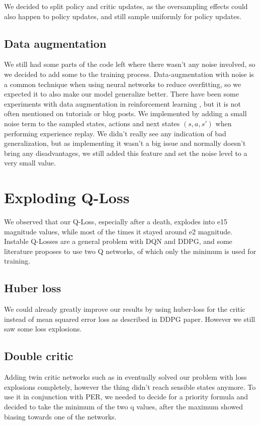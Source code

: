 \documentclass[hyperref,german,beleg]{cgvpub}
\begin{document}
We decided to split policy and critic updates, as the oversampling effects could also happen to policy updates, and still sample uniformly for policy updates. 

\subsection{Data augmentation}

We still had some parts of the code left where there wasn't any noise involved, so we decided to add some to the training process. Data-augmentation with noise is a common technique when using neural networks \cite[p.347]{bishopNeuralNetworksPattern1995} to reduce overfitting, so we expected it to also make our model generalize better. There have been some experiments with data augmentation in reinforcement learning \cite{cobbeQuantifyingGeneralizationReinforcement2019}, but it is not often mentioned on tutorials or blog posts. We implemented by adding a small noise term to the sampled states, actions and next states \((s, a, s')\) when performing experience replay. We didn't really see any indication of bad generalization, but as implementing it wasn't a big issue and normally doesn't bring any disadvantages, we still added this feature and set the noise level to a very small value.

\section{Exploding Q-Loss}

We observed that our Q-Loss, especially after a death, explodes into e15 magnitude values, while most of the times it stayed around e2 magnitude. Instable Q-Losses are a general problem with DQN and DDPG, and some literature \cite{fujimotoAddressingFunctionApproximation2018} proposes to use two Q networks, of which only the minimum is used for training. 

\subsection{Huber loss}
We could already greatly improve our results by using huber-loss \cite{huber1964} for the critic instead of mean squared error loss as described in DDPG paper. However we still saw some loss explosions.

\subsection{Double critic}
Adding twin critic networks such as in \cite{fujimotoAddressingFunctionApproximation2018} eventually solved our problem with loss explosions completely, however the thing didn't reach sensible states anymore. To use it in conjunction with \ac{PER}, we needed to decide for a priority formula and decided to take the minimum of the two q values, after the maximum showed biasing towards one of the networks. 
\end{document}
